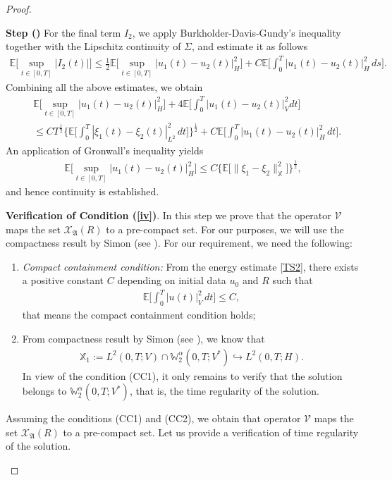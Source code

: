 \documentclass[english,a4paper,11pt]{amsart}
\theoremstyle{plain}
\theoremstyle{definition}
\theoremstyle{remark}
\renewcommand{\emph}[1]{{\sl #1}}
\numberwithin{equation}{section}
\newcounter{lil1}
\newenvironment{step}
{\begin{list} { \bf Step (\Roman{lil1})}
		{ \usecounter{lil1}
			\setlength{\leftmargin}{0.0cm}
			\setlength{\topsep}{0.2cm}
			\setlength{\itemsep}{0.0cm}
			\setlength{\parsep}{0.1cm}
			\setlength{\itemindent}{0.8cm}
			\setlength{\parskip}{0.0cm}}}
	{\end{list}}
\newcounter{lil33}
\newcounter{lil1q}
\newcommand{\MA}{\mathfrak{A}}
\newcommand{\EE}{ \mathbb{E} }
\newcommand{\X}{\mathbb{X}}
\renewcommand{\emph}[1]{{\sl #1}}
\begin{document}
\begin{proof}
\begin{step}
For the final term $I_2$, we apply Burkholder-Davis-Gundy's inequality together with the Lipschitz continuity of $\Sigma$, and estimate it as follows
\begin{align*}
	\EE\bigg[\sup_{t\in[0,T]}|I_2(t)|\bigg] \leq \frac{1}{2}\EE\bigg[\sup_{t\in[0,T]} | u_1(t)-u_2(t) | _H^2\bigg]+ C \EE\bigg[\int_0^T | u_1(t)-u_2(t) | _H^2\,ds \bigg].
\end{align*}Combining all the above estimates, we obtain
\begin{align*}
	&	\EE\bigg[\sup_{t\in[0,T]} | u_1(t)-u_2(t) | _H^2\bigg]+4\EE\bigg[\int_0^T  | u_1(t)-u_2(t) | _V^2d t\bigg] \\&\leq 
	C T^{\frac{1}{2}}\bigg\{\EE\bigg[\int_0^T | \xi_1(t)-\xi_2(t) | _{L^2}^2\,dt\bigg]\bigg\}^{\frac{1}{2}}+C \EE\bigg[\int_0^T |  u_1(t)-u_2(t) | _H^2\,dt\bigg].
\end{align*}An application of Gronwall's inequality yields
\begin{align*}
	\EE\bigg[\sup_{t\in[0,T]}|u_1(t)-u_2(t)|_H^2\bigg] \leq C \Big\{\EE\big[\|\xi_1-\xi_2\|_{\X}^2\big]\Big\}^{\frac{1}{2}}, 
\end{align*} and hence continuity is established.


 
\item \textbf{Verification of Condition (\ref{iv})}. In this step we prove that the operator $\mathcal{V}$ maps the set $\mathcal{X}_{\MA}(R)$ to a pre-compact set.  For our purposes, we will use the compactness result by Simon (see \cite{Simon1986}). For our requirement, we need the following:
\begin{enumerate}
	\item[(CC1)]\label{CCi} \emph{Compact containment condition:} From the energy estimate \eqref{TS2}, there exists a positive constant $C$ depending on initial data $u_0$ and $R$ such that 
	\begin{align*}
		\EE\bigg[\int_0^T|u(t)|_V^2\,dt\bigg]\leq C, 
	\end{align*}that means the compact containment condition holds;

\item[(CC2)]\label{CCii} From compactness result by Simon (see \cite{Simon1986}), we know that 
\begin{align*}
\X_1:=	L^2(0,T;V)\cap \mathbb{W}^\alpha_2(0,T;V^\ast) \hookrightarrow L^2(0,T;H).
\end{align*}In view of the condition (CC1), it only remains to verify that the solution belongs to $\mathbb{W}^\alpha_2(0,T;V^\ast)$, that is, the time regularity of the solution.
\end{enumerate}Assuming the conditions (CC1) and (CC2), we obtain that operator $\mathcal{V}$ maps the set $\mathcal{X}_{\MA}(R)$ to a pre-compact set. Let us provide a verification of time regularity of the solution.





\end{step}
\end{proof}
\end{document}
